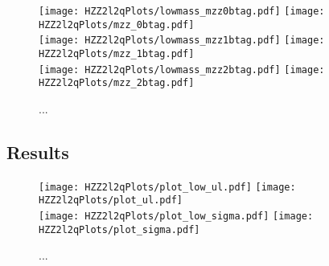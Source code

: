 \begin{figure}
\begin{center}
\texttt{[image: HZZ2l2qPlots/lowmass\_mzz0btag.pdf]}
\texttt{[image: HZZ2l2qPlots/mzz\_0btag.pdf]}\\
\texttt{[image: HZZ2l2qPlots/lowmass\_mzz1btag.pdf]}
\texttt{[image: HZZ2l2qPlots/mzz\_1btag.pdf]}\\
\texttt{[image: HZZ2l2qPlots/lowmass\_mzz2btag.pdf]}
\texttt{[image: HZZ2l2qPlots/mzz\_2btag.pdf]}
\label{fyn:HZZ2l2qMassDistributions}
\caption{ ... }
\end{center}
\end{figure}

\subsection{Results}
\label{sec:HZZ2l2qxsec}

\begin{figure}
\begin{center}
\texttt{[image: HZZ2l2qPlots/plot\_low\_ul.pdf]}
\texttt{[image: HZZ2l2qPlots/plot\_ul.pdf]}\\
\texttt{[image: HZZ2l2qPlots/plot\_low\_sigma.pdf]}
\texttt{[image: HZZ2l2qPlots/plot\_sigma.pdf]}\\
\label{fyn:HZZ2l2qLimits}
\caption{ ... }
\end{center}
\end{figure}


